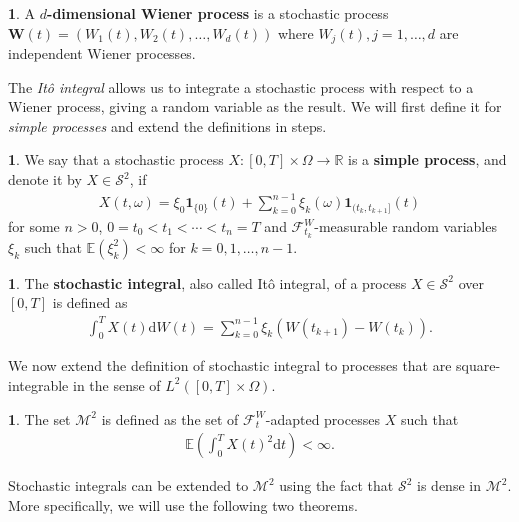\documentclass[english]{article}
\numberwithin{equation}{section}
\numberwithin{figure}{section}
\theoremstyle{bolddescit}
\theoremstyle{definition}
\newtheorem{definition}[theorem]{\protect\definitionname}
\theoremstyle{definition}
\theoremstyle{plain}
\theoremstyle{plain}
\theoremstyle{bolddesc}
\theoremstyle{plain}
\theoremstyle{remark}
\providecommand{\definitionname}{Definition}
\begin{document}
\begin{definition}
  A \textbf{$d$-dimensional Wiener process} is a stochastic process $\mathbf{W}(t) = (W_1(t), W_2(t), \ldots, W_d(t))$ where $W_j(t), j=1,\ldots,d$ are independent Wiener processes.
\end{definition}

The \textit{It\^o integral} allows us to integrate a stochastic process with respect to a Wiener process, giving a random variable as the result. We will first define it for \textit{simple processes} and extend the definitions in steps.

\begin{definition}
  We say that a stochastic process $X : [0,T] \times \Omega \to \mathbb{R}$ is a \textbf{simple process}, and denote it by $X \in \mathcal{S}^2$, if
  \begin{align*}
    X(t,\omega) = \xi_0 \mathbf{1}_{\{0\}}(t) + \sum_{k=0}^{n-1} \xi_k(\omega) \mathbf{1}_{(t_k,t_{k+1}]}(t)
  \end{align*}
  for some $n > 0$, $0 = t_0 < t_1 < \cdots < t_n = T$ and $\mathcal{F}^W_{t_k}$-measurable random variables $\xi_k$ such that $\mathbb{E}(\xi_k^2) < \infty$ for $k = 0,1,\ldots,n-1$.
\end{definition}

\begin{definition}
  The \textbf{stochastic integral}, also called It\^o integral, of a process $X \in \mathcal{S}^2$ over $[0,T]$ is defined as
  \begin{align*}
    \int_0^T X(t) \mathrm{d}W(t) = \sum_{k=0}^{n-1} \xi_k (W(t_{k+1}) - W(t_k)).
  \end{align*}
\end{definition}

We now extend the definition of stochastic integral to processes that are square-integrable in the sense of $L^2([0,T] \times \Omega)$.

\begin{definition}
  The set $\mathcal{M}^2$ is defined as the set of $\mathcal{F}^W_t$-adapted processes $X$ such that
  \begin{align*}
    \mathbb{E}\left(\int_0^T X(t)^2 \mathrm{d}t \right) < \infty.
  \end{align*}
\end{definition}

Stochastic integrals can be extended to $\mathcal{M}^2$ using the fact that $\mathcal{S}^2$ is dense in $\mathcal{M}^2$. More specifically, we will use the following two theorems.
\end{document}
